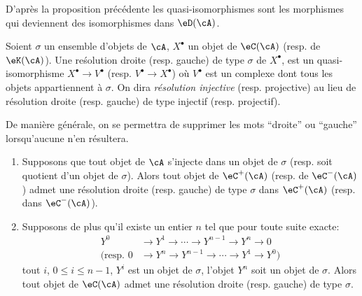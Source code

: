 D'après la proposition précédente les quasi-isomorphismes sont les 
morphismes qui deviennent des isomorphismes dans $\eD(\cA)$. 





\begin{definition}\label{VIII:3-1-8}
Soient $\sigma$ un ensemble d'objets de $\cA$, $X^\bullet$ un objet de 
$\eC(\cA)$ (resp. de $\eK(\cA)$). Une re\'solution droite (resp. gauche) de type 
$\sigma$ de $X^\bullet$, est un quasi-isomorphisme $X^\bullet \to V^\bullet$ 
(resp. $V^\bullet \to X^\bullet$) où $V^\bullet$ est un complexe dont tous 
les objets appartiennent à $\sigma$. On dira \emph{résolution injective} 
(resp. projective) au lieu de résolution droite (resp. gauche) de type 
injectif (resp. projectif). 
\end{definition}

De manière générale, on se permettra de supprimer les mots ``droite'' ou 
``gauche'' lorsqu'aucune  n'en résultera. 





\begin{proposition}\label{VIII:3-1-9}
\begin{enumerate}
  \item Supposons que tout objet de $\cA$ s'injecte dans un objet de $\sigma$ 
    (resp. soit quotient d'un objet de $\sigma$). Alors tout objet de 
    $\eC^+(\cA)$ (resp. de $\eC^-(\cA)$) admet une résolution droite 
    (resp. gauche) de type $\sigma$ dans $\eC^+(\cA)$ (resp. dans 
    $\eC^-(\cA)$). 
  \item Supposons de plus qu'il existe un entier $n$ tel que pour toute suite 
    exacte: 
    \begin{align*}
      Y^0 &\to Y^1 \to \cdots \to Y^{n-1} \to Y^n \to 0 \\
      \text{(resp. } 0 &\to Y^n \to Y^{n-1} \to \cdots \to Y^1 \to Y^0 \text{)} 
    \end{align*}
     tout $i$, $0\leqslant i\leqslant n-1$, $Y^i$ est 
    un objet de $\sigma$, l'objet $Y^n$ soit un objet de $\sigma$. Alors tout 
    objet de $\eC(\cA)$ admet une résolution droite (resp. gauche) de type 
    $\sigma$. 
\end{enumerate}
\end{proposition}










